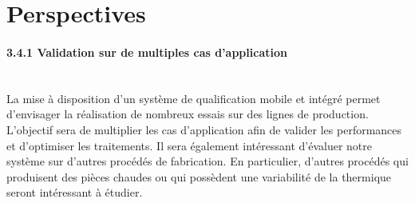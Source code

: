 \vspace{-15mm}
\section{Perspectives}
\vspace{-3mm}
\paragraph{3.4.1 Validation sur de multiples cas d'application} \mbox{} \\
La mise à disposition d'un système de qualification mobile et intégré permet d'envisager la réalisation de nombreux essais sur des lignes de production.
L'objectif sera de multiplier les cas d'application afin de valider les performances et d'optimiser les traitements.
Il sera également intéressant d'évaluer notre système sur d'autres procédés de fabrication.
En particulier, d'autres procédés qui produisent des pièces chaudes ou qui possèdent une variabilité de la thermique seront intéressant à étudier.
\vspace{-4mm}
